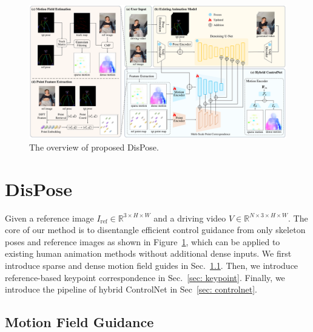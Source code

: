 \begin{figure}[t]
    \centering
    \includegraphics[width=1.0\columnwidth]{./image/pipeline.pdf}
    \vspace{-15pt}
    \caption{The overview of proposed DisPose.}
    \label{fig:pipeline}
\end{figure}
\section{DisPose}
Given a reference image $I_{\mathrm{ref}}\!\in\!\mathbb{R}^{3 \times H \times W}$ and a driving video $V\!\in\!\mathbb{R}^{N\times 3 \times H \times W}$. The core of our method is to disentangle efficient control guidance from only skeleton poses and reference images as shown in Figure~\ref{fig:pipeline}, which can be applied to existing human animation methods without additional dense inputs. We first introduce sparse and dense motion field guides in Sec.~\ref{sec: motion}. Then, we introduce reference-based keypoint correspondence in Sec.~\ref{sec: keypoint}. Finally, we introduce the pipeline of hybrid ControlNet in Sec~\ref{sec: controlnet}.
\subsection{Motion Field Guidance}
\label{sec: motion}

